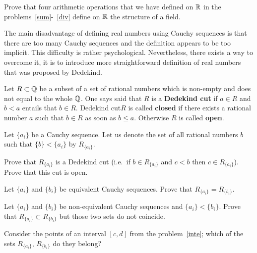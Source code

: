\documentclass[12pt]{article}
\begin{document}
\begin{zadacha}[!] Prove that four arithmetic operations that we have
  defined on ${\mathbb R}$ in the problems~\ref{sum}-~\ref{div} define on ${\mathbb R}$
  the structure of a field.
\end{zadacha}


The main disadvantage of defining real numbers using Cauchy sequences
is that there are too many Cauchy sequences and the definition appears
to be too implicit. This difficulty is rather
psychological. Nevertheless, there exists a way to overcome it, it is
to introduce more straightforward definition of real numbers that was
proposed by Dedekind.

\begin{opredelenie}
Let $R \subset {\mathbb Q}$ be a subset of a set of rational numbers which is
non-empty and does not equal to the whole ${\mathbb Q}$. One says said that $R$ is
a {\bf Dedekind cut} if $a \in R$ and $b < a$ entails that $b \in
R$. Dedekind cut$R$ is called {\bf closed} if there exists a
rational number $a$ such that $b \in R$ as soon as $b \leq
a$. Otherwise $R$ is called {\bf open}.
\end{opredelenie}

Let $\{a_i\}$ be a Cauchy sequence. Let us denote the set of all
rational numbers $b$ such that $\{b\} < \{a_i\}$ by $R_{\{a_i\}}$.

\begin{zadacha}
Prove that $R_{\{a_i\}}$ is a Dedekind cut (i.e.\ if $b \in
R_{\{a_i\}}$ and $c < b$ then $c \in R_{\{a_i\}}$). Prove that this
cut is open.
\end{zadacha}

\begin{zadacha} Let $\{ a_i\}$ and $\{b_i\}$ be equivalent Cauchy
  sequences. Prove that $R_{\{a_i\}} = R_{\{b_i\}}$.
\end{zadacha}

\begin{zadacha}
Let $\{ a_i\}$ and $\{b_i\}$ be non-equivalent Cauchy sequences and
$\{a_i\} < \{b_i\}$. Prove that $R_{\{a_i\}} \subset
R_{\{b_i\}}$ but those two sets do not coincide.
\end{zadacha}

\begin{ukazanie}
Consider the points of an interval $[c,d]$ from the
problem~\ref{inte}; which of the sets $R_{\{a_i\}}$, $R_{\{b_i\}}$ do
they belong?
\end{ukazanie}
 
\end{document}
